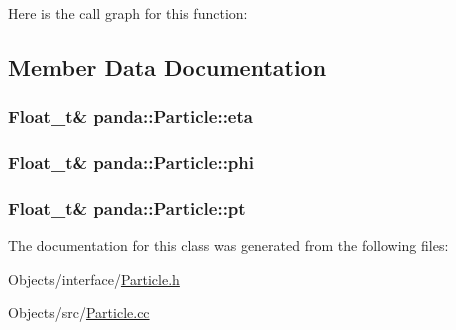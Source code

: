 Here is the call graph for this function:

\subsection{Member Data Documentation}
\hypertarget{classpanda_1_1Particle_a57287d1410aa744cfb39a067bf4b44b7}{
\subsubsection[{eta}]{\setlength{\rightskip}{0pt plus 5cm}Float\_\-t\& {\bf panda::Particle::eta}}}
\label{classpanda_1_1Particle_a57287d1410aa744cfb39a067bf4b44b7}
\hypertarget{classpanda_1_1Particle_acc1b5ccbda5824dcf754a6a4856c44da}{
\subsubsection[{phi}]{\setlength{\rightskip}{0pt plus 5cm}Float\_\-t\& {\bf panda::Particle::phi}}}
\label{classpanda_1_1Particle_acc1b5ccbda5824dcf754a6a4856c44da}
\hypertarget{classpanda_1_1Particle_a9b74430c3c732132e01e6e215a6b3dd0}{
\subsubsection[{pt}]{\setlength{\rightskip}{0pt plus 5cm}Float\_\-t\& {\bf panda::Particle::pt}}}
\label{classpanda_1_1Particle_a9b74430c3c732132e01e6e215a6b3dd0}


The documentation for this class was generated from the following files:\begin{DoxyCompactItemize}
\item 
Objects/interface/\hyperlink{Particle_8h}{Particle.h}\item 
Objects/src/\hyperlink{Particle_8cc}{Particle.cc}\end{DoxyCompactItemize}
